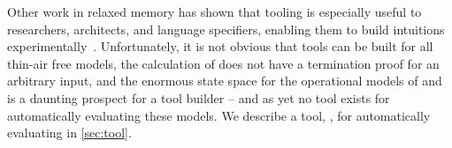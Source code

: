 Other work in relaxed memory has shown that tooling is especially useful to researchers, architects, and language specifiers, enabling them to build intuitions experimentally~\cite{DBLP:conf/esop/PaviottiCPWOB20,PrideMM,alglave,Batty:2011:MCC:1926385.1926394}.
Unfortunately, it is not obvious that tools can be built for all thin-air free models, the calculation of \citet{Pichon-Pharabod:2016:CSR:2837614.2837616} does not have a termination proof for an arbitrary input, and the enormous state space for the operational models of \citet{DBLP:conf/popl/KangHLVD17} and \citet{DBLP:journals/pacmpl/ChakrabortyV19} is a daunting prospect for a tool builder -- and as yet no tool exists for automatically evaluating these models.
We describe a tool, \PwTer, for automatically evaluating \PwT{} in \textsection\ref{sec:tool}.
